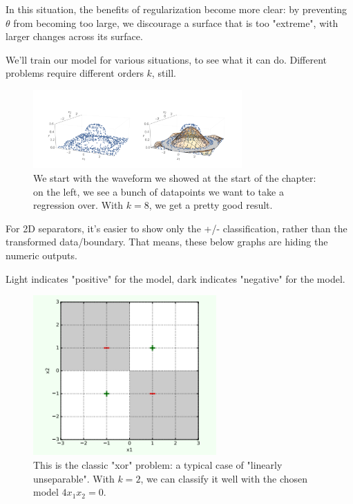             In this situation, the benefits of regularization become more clear: by preventing $\theta$ from becoming too large, we discourage a surface that is too "extreme", with larger changes across its surface.

            We'll train our model for various situations, to see what it can do. Different problems require different orders $k$, still.
            
            \begin{figure}[H]
                \centering
                
                \includegraphics[width=80mm,scale=0.5]{images/feature_images/vibrations.png}
                \caption*{We start with the waveform we showed at the start of the chapter: on the left, we see a bunch of datapoints we want to take a regression over. With $k=8$, we get a pretty good result.}
            \end{figure}

            For 2D separators, it's easier to show only the +/- classification, rather than the transformed data/boundary. That means, these below graphs are hiding the numeric outputs.
            
            Light indicates "positive" for the model, dark indicates "negative" for the model.

            \begin{figure}[H]
                \centering
                
                \includegraphics[width=70mm,scale=0.5]{images/feature_images/xor.png}
                \caption*{This is the classic "xor" problem: a typical case of "linearly unseparable". With $k=2$, we can classify it well with the chosen model $4x_1x_2=0$.}
            \end{figure}

